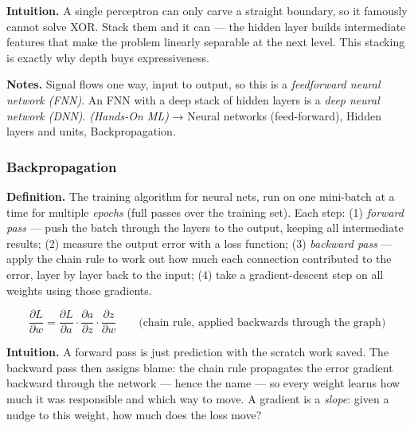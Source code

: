 \documentclass[
  10pt,
  letterpaper,
  onecolumn]{article}
\begin{document}
\textbf{Intuition.} A single perceptron can only carve a straight
boundary, so it famously cannot solve XOR. Stack them and it can --- the
hidden layer builds intermediate features that make the problem linearly
separable at the next level. This stacking is exactly why depth buys
expressiveness.

\textbf{Notes.} Signal flows one way, input to output, so this is a
\emph{feedforward neural network (FNN)}. An FNN with a deep stack of
hidden layers is a \emph{deep neural network (DNN)}. \emph{(Hands-On
ML)} → Neural networks (feed-forward), Hidden layers and units,
Backpropagation.

\hypertarget{backpropagation}{%
\subsubsection{Backpropagation}\label{backpropagation}}

\textbf{Definition.} The training algorithm for neural nets, run on one
mini-batch at a time for multiple \emph{epochs} (full passes over the
training set). Each step: (1) \emph{forward pass} --- push the batch
through the layers to the output, keeping all intermediate results; (2)
measure the output error with a loss function; (3) \emph{backward pass}
--- apply the chain rule to work out how much each connection
contributed to the error, layer by layer back to the input; (4) take a
gradient-descent step on all weights using those gradients.

\begin{equation*}
\frac{\partial L}{\partial w}=\frac{\partial L}{\partial a}\cdot\frac{\partial a}{\partial z}\cdot\frac{\partial z}{\partial w}
\qquad\text{(chain rule, applied backwards through the graph)}
\end{equation*}

\textbf{Intuition.} A forward pass is just prediction with the scratch
work saved. The backward pass then assigns blame: the chain rule
propagates the error gradient backward through the network --- hence the
name --- so every weight learns how much it was responsible and which
way to move. A gradient is a \emph{slope}: given a nudge to this weight,
how much does the loss move?
\end{document}
